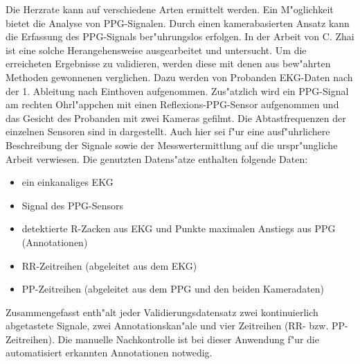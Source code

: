 Die Herzrate kann auf verschiedene Arten ermittelt werden.
Ein M"oglichkeit bietet die Analyse von \ac{PPG}-Signalen.
Durch einen kamerabasierten Ansatz kann die Erfassung des \ac{PPG}-Signals ber"uhrungslos erfolgen.
In der Arbeit von C. Zhai \cite{Zhai2012} ist eine solche Herangehensweise ausgearbeitet und untersucht.
Um die erreicheten Ergebnisse zu validieren, werden diese mit denen aus bew"ahrten Methoden gewonnenen verglichen.
Dazu werden von Probanden \ac{EKG}-Daten nach der 1. Ableitung nach Einthoven aufgenommen.
Zus"atzlich wird ein \ac{PPG}-Signal am rechten Ohrl"appchen mit einen Reflexions-\ac{PPG}-Sensor aufgenommen und das Gesicht des Probanden mit zwei Kameras gefilmt.
Die Abtastfrequenzen der einzelnen Sensoren sind in  dargestellt.
Auch hier sei f"ur eine ausf"uhrlichere Beschreibung der Signale sowie der Messwertermittlung auf die urspr"ungliche Arbeit \cite{Zhai2012} verwiesen.
Die genutzten Datens"atze enthalten folgende Daten:
\begin{itemize}
	\item ein einkanaliges \ac{EKG}
	\item Signal des \ac{PPG}-Sensors
	\item detektierte R-Zacken aus \ac{EKG} und Punkte maximalen Anstiegs aus \ac{PPG} (Annotationen)
	\item RR-Zeitreihen (abgeleitet aus dem \ac{EKG})
	\item PP-Zeitreihen (abgeleitet aus dem \ac{PPG} und den beiden Kameradaten)
\end{itemize}
Zusammengefasst enth"alt jeder Validierungsdatensatz zwei kontinuierlich abgetastete Signale, zwei Annotationskan"ale und vier Zeitreihen (RR- bzw. PP-Zeitreihen).
Die manuelle Nachkontrolle ist bei dieser Anwendung f"ur die automatisiert erkannten Annotationen notwedig.



